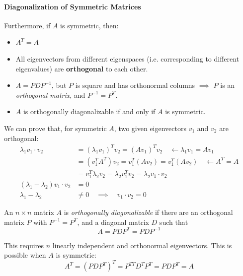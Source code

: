 \documentclass[]{article}
\begin{document}
\paragraph{Diagonalization of Symmetric Matrices \\}
Furthermore, if $A$ is symmetric, then:
\begin{itemize}
	\item $A^{T} = A$
	\item All eigenvectors from different eigenspaces (i.e. corresponding to different eigenvalues) are \textbf{orthogonal} to each other.
	\item $A = PDP^{-1}$, but $P$ is square and has orthonormal columns $\implies$ $P$ is an \textit{orthogonal matrix}, and $P^{-1} = P^{T}$.
	\item $A$ is orthogonally diagonalizable if and only if $A$ is symmetric. 
\end{itemize}

We can prove that, for symmetric $A$, two given eigenvectors $v_1$ and $v_2$ are orthogonal:
\begin{align*}
\lambda_1 v_1 \cdot v_2 &= (\lambda_1 v_1)^{T} v_2 = (Av_1)^{T}v_2 \quad \leftarrow \lambda_1 v_1 = A v_1 \\
&= (v_{1}^{T}A^{T})v_2 = v_{1}^{T}(Av_2) = v^{T}_{1}(Av_{2}) \quad \leftarrow A^T = A \\
&= v_{1}^{T} \lambda_{2}v_{2} = \lambda_{2}v_{1}^{T}v_{2} = \lambda_{2}v_{1} \cdot v_{2} \\
(\lambda_{1} - \lambda_{2})v_{1}\cdot v_{2} &= 0 \\
\lambda_{1} - \lambda_{2} &\neq 0 \quad \implies \quad v_{1} \cdot v_{2} = 0
\end{align*}

An $n \times n$ matrix $A$ is \textit{orthogonally diagonalizable} if there are an orthogonal matrix $P$ with $P^{-1} = P^{T}$, and a diagonal matrix $D$ such that
\begin{equation}
A = PDP^{T} = PDP^{-1}
\end{equation}

This requires $n$ linearly independent and orthonormal eigenvectors. This is possible when $A$ is symmetric:
\begin{equation*}
A^{T} = (PDP^{T})^{T} = P^{TT}D^{T}P^{T} = PDP^{T} = A
\end{equation*}
\end{document}
